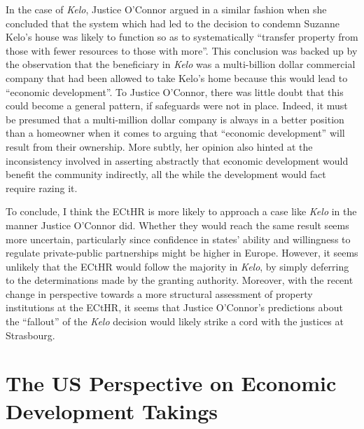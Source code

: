 In the case of {\it Kelo}, Justice O'Connor argued in  a similar fashion when she concluded that the system which had led to the decision to condemn Suzanne Kelo's house was likely to function so as to systematically ``transfer property from those with fewer resources to those with more''. This conclusion was backed up by the observation that the beneficiary in {\it Kelo} was a multi-billion dollar commercial company that had been allowed to take Kelo's home because this would lead to ``economic development''. To Justice O'Connor, there was little doubt that this could become a general pattern, if safeguards were not in place. Indeed, it must be presumed that a multi-million dollar company is always in a better position than a homeowner when it comes to arguing that  ``economic development'' will result from their ownership. More subtly, her opinion also hinted at the inconsistency involved in asserting abstractly that economic development would benefit the community indirectly, all the while the development would  fact require razing it.

To conclude, I think the ECtHR is more likely to approach a case like {\it Kelo} in the manner Justice O'Connor did. Whether they would reach the same result seems more uncertain, particularly since confidence in states' ability and willingness to regulate private-public partnerships might be higher in Europe. However, it seems unlikely that the ECtHR would follow the majority in {\it Kelo}, by simply deferring to the determinations made by the granting authority. Moreover, with the recent change in perspective towards a more structural assessment of property institutions at the ECtHR, it seems that Justice O'Connor's predictions about the ``fallout'' of the {\it Kelo} decision would likely strike a cord with the justices at Strasbourg. 

\section{The US Perspective on Economic Development Takings}\label{sec:us}

